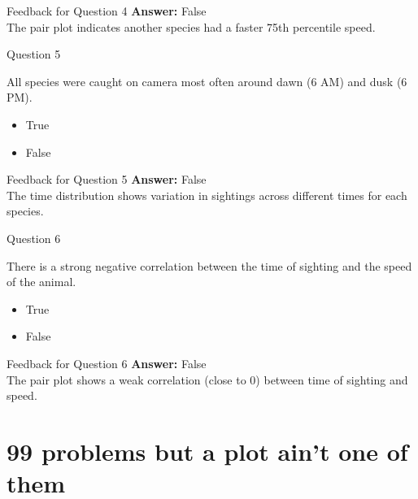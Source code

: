 \documentclass[
  ignorenonframetext,
]{beamer}
\providecommand{\tightlist}{%
  \setlength{\itemsep}{0pt}\setlength{\parskip}{0pt}}
\begin{document}
\begin{frame}{Feedback for Question 4}
\label{feedback-for-question-4}
\textbf{Answer:} False\\
The pair plot indicates another species had a faster 75th percentile
speed.
\end{frame}

\begin{frame}{Question 5}
\label{question-5-1}
\begin{block}{All species were caught on camera most often around dawn
(6 AM) and dusk (6 PM).}
\label{all-species-were-caught-on-camera-most-often-around-dawn-6-am-and-dusk-6-pm.}
\begin{itemize}
\tightlist
\item
  True
\item
  False
\end{itemize}
\end{block}
\end{frame}

\begin{frame}{Feedback for Question 5}
\label{feedback-for-question-5}
\textbf{Answer:} False\\
The time distribution shows variation in sightings across different
times for each species.
\end{frame}

\begin{frame}{Question 6}
\label{question-6}
\begin{block}{There is a strong negative correlation between the time of
sighting and the speed of the animal.}
\label{there-is-a-strong-negative-correlation-between-the-time-of-sighting-and-the-speed-of-the-animal.}
\begin{itemize}
\tightlist
\item
  True
\item
  False
\end{itemize}
\end{block}
\end{frame}

\begin{frame}{Feedback for Question 6}
\label{feedback-for-question-6}
\textbf{Answer:} False\\
The pair plot shows a weak correlation (close to 0) between time of
sighting and speed.
\end{frame}

\section{99 problems but a plot ain't one of
them}\label{problems-but-a-plot-aint-one-of-them}
\end{document}
